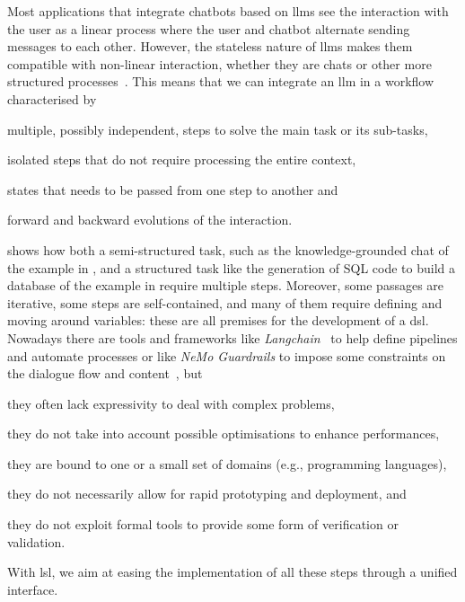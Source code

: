 \documentclass[manuscript,screen]{acmart}
\begin{document}
Most applications that integrate chatbots based on \acp{llm} see the interaction with the user as a linear process where the user and chatbot alternate sending messages to each other.
However, the stateless nature of \acp{llm} makes them compatible with non-linear interaction, whether they are chats or other more structured processes~\cite{fornasiere-etal-2024-medical,DBLP:conf/avi/PucciPAM24}.
This means that we can integrate an \ac{llm} in a workflow characterised by
\begin{enumerate*}[label=(\roman*)]
    \item multiple, possibly independent, steps to solve the main task or its sub-tasks,
    \item isolated steps that do not require processing the entire context,
    \item states that needs to be passed from one step to another and
    \item forward and backward evolutions of the interaction.
\end{enumerate*}

 shows how both a semi-structured task, such as the knowledge-grounded chat of the example in , and a structured task like the generation of SQL code to build a database of the example in  require multiple steps.
Moreover, some passages are iterative, some steps are self-contained, and many of them require defining and moving around variables: these are all premises for the development of a \ac{dsl}.
Nowadays there are tools and frameworks like \emph{Langchain}~\cite{docs/introduction/} to help define pipelines and automate processes or like \emph{NeMo Guardrails} to impose some constraints on the dialogue flow and content~\cite{DBLP:conf/emnlp/RebedeaDSPC23}, but
\begin{enumerate*}[label=(\roman*)]
    \item they often lack expressivity to deal with complex problems,
    \item they do not take into account possible optimisations to enhance performances,
    \item they are bound to one or a small set of domains (e.g., programming languages),
    \item they do not necessarily allow for rapid prototyping and deployment, and
    \item they do not exploit formal tools to provide some form of verification or validation.
\end{enumerate*}
With \ac{lsl}, we aim at easing the implementation of all these steps through a unified interface.
\end{document}
